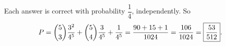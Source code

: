 Each answer is correct with probability $\dfrac{1}{4}$, independently. So
\[P=\dbinom53\dfrac{3^2}{4^5}+\dbinom54\dfrac{3}{4^5}+\dfrac{1}{4^5}=\dfrac{90+15+1}{1024}=\dfrac{106}{1024}=\boxed{\dfrac{53}{512}}.\]
